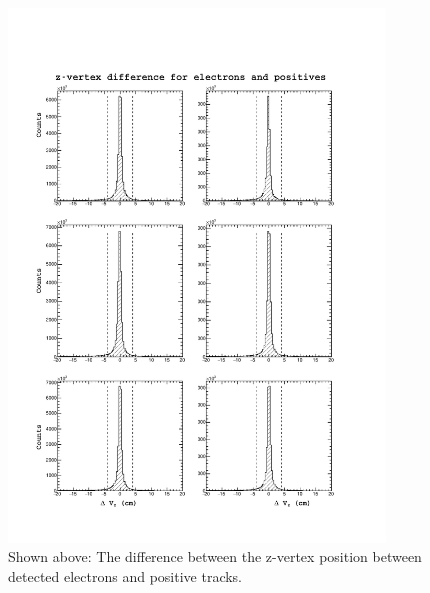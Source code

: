 \begin{figure}
  \label{fig:dvz}
  \begin{center}
    \includegraphics[width=10cm]{image/dvz.pdf}
    \caption{Shown above: The difference between the z-vertex position between detected electrons and positive tracks.}
  \end{center}
\end{figure}

